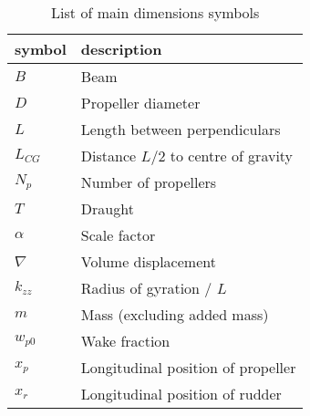 \begin{table}[h]
\footnotesize
\caption{List of main dimensions symbols}
    \label{tab:nomenclature}

    \centering
    \begin{tabular}{|T|T|}
\hline


symbol
&

description
\\
\hline

\(B\)
&

Beam
\\
\hline

\(D\)
&

Propeller diameter
\\
\hline

\(L\)
&

Length between perpendiculars
\\
\hline

\(L_{CG}\)
&

Distance \(L/2\) to centre of gravity
\\
\hline

\(N_p\)
&

Number of propellers
\\
\hline

\(T\)
&

Draught
\\
\hline

\(\alpha\)
&

Scale factor
\\
\hline

\(\nabla\)
&

Volume displacement
\\
\hline

\(k_{zz}\)
&

Radius of gyration / \(L\)
\\
\hline

\(m\)
&

Mass (excluding added mass)
\\
\hline

\(w_{p0}\)
&

Wake fraction
\\
\hline

\(x_{p}\)
&

Longitudinal position of propeller
\\
\hline

\(x_{r}\)
&

Longitudinal position of rudder
\\
\hline
\end{tabular}
\end{table}

